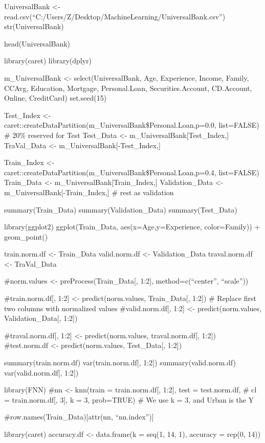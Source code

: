 \documentclass[
]{article}
\author{}
\date{\vspace{-2.5em}}
\begin{document}
UniversalBank \textless-
read.csv(``C:/Users/Z/Desktop/MachineLearning/UniversalBank.csv'')
str(UniversalBank)

head(UniversalBank)

library(caret) library(dplyr)

m\_UniversalBank \textless- select(UniversalBank, Age, Experience,
Income, Family, CCAvg, Education, Mortgage, Personal.Loan,
Securities.Account, CD.Account, Online, CreditCard) set.seed(15)

Test\_Index \textless-
caret::createDataPartition(m\_UniversalBank\$Personal.Loan,p=0.0,
list=FALSE) \# 20\% reserved for Test Test\_Data \textless-
m\_UniversalBank{[}Test\_Index,{]} TraVal\_Data \textless-
m\_UniversalBank{[}-Test\_Index,{]}

Train\_Index \textless-
caret::createDataPartition(m\_UniversalBank\$Personal.Loan,p=0.4,
list=FALSE) Train\_Data \textless- m\_UniversalBank{[}Train\_Index,{]}
Validation\_Data \textless- m\_UniversalBank{[}-Train\_Index,{]} \# rest
as validation

summary(Train\_Data) summary(Validation\_Data) summary(Test\_Data)

library(ggplot2) ggplot(Train\_Data, aes(x=Age,y=Experience,
color=Family)) + geom\_point()

train.norm.df \textless- Train\_Data valid.norm.df \textless-
Validation\_Data traval.norm.df \textless- TraVal\_Data

\#norm.values \textless- preProcess(Train\_Data{[}, 1:2{]},
method=c(``center'', ``scale''))

\#train.norm.df{[}, 1:2{]} \textless- predict(norm.values,
Train\_Data{[}, 1:2{]}) \# Replace first two columns with normalized
values \#valid.norm.df{[}, 1:2{]} \textless- predict(norm.values,
Validation\_Data{[}, 1:2{]})

\#traval.norm.df{[}, 1:2{]} \textless- predict(norm.values,
traval.norm.df{[}, 1:2{]}) \#test.norm.df \textless-
predict(norm.values, Test\_Data{[}, 1:2{]})

summary(train.norm.df) var(train.norm.df{[}, 1:2{]})
summary(valid.norm.df) var(valid.norm.df{[}, 1:2{]})

library(FNN) \#nn \textless- knn(train = train.norm.df{[}, 1:2{]}, test
= test.norm.df, \# cl = train.norm.df{[}, 3{]}, k = 3, prob=TRUE) \# We
use k = 3, and Urban is the Y

\#row.names(Train\_Data){[}attr(nn, ``nn.index''){]}

library(caret) accuracy.df \textless- data.frame(k = seq(1, 14, 1),
accuracy = rep(0, 14))
\end{document}
